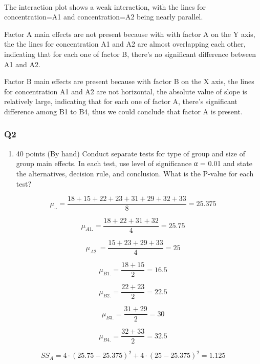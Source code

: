 \documentclass[11pt]{article}
\providecommand{\tightlist}{%
      \setlength{\itemsep}{0pt}\setlength{\parskip}{0pt}}
\begin{document}
    \begin{center}
    \end{center}
    { \hspace*{\fill} \\}
    
    The interaction plot shows a weak interaction, with the lines for
concentration=A1 and concentration=A2 being nearly parallel.

Factor A main effects are not present because with with factor A on the
Y axis, the the lines for concentration A1 and A2 are almost overlapping
each other, indicating that for each one of factor B, there's no
significant difference between A1 and A2.

Factor B main effects are present because with factor B on the X axis,
the lines for concentration A1 and A2 are not horizontal, the absolute
value of slope is relatively large, indicating that for each one of
factor A, there's significant difference among B1 to B4, thus we could
conclude that factor A is present.

    \subsubsection*{Q2}\label{q2}

\begin{enumerate}
\def\labelenumi{\arabic{enumi}.}
\setcounter{enumi}{1}
\tightlist
\item
  40 points (By hand) Conduct separate tests for type of group and size
  of group main effects. In each test, use level of significance α =
  0.01 and state the alternatives, decision rule, and conclusion. What
  is the P-value for each test?
\end{enumerate}

    \[\mu_{..} = \frac{18+15+22+23+31+29+32+33}{8} = 25.375\]

\[\mu_{A1.} = \frac{18+22+31+32}{4} = 25.75\]

\[\mu_{A2.} = \frac{15+23+29+33}{4} = 25\]

\[\mu_{B1.} = \frac{18+15}{2} = 16.5\]

\[\mu_{B2.} = \frac{22+23}{2} = 22.5\]

\[\mu_{B3.} = \frac{31+29}{2} = 30\]

\[\mu_{B4.} = \frac{32+33}{2} = 32.5\]

\[SS_A = 4 \cdot (25.75-25.375)^2 + 4 \cdot (25 - 25.375)^2 = 1.125\]
\end{document}
